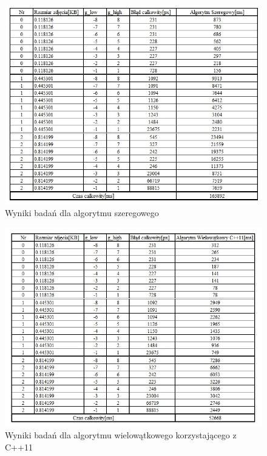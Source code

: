 \documentclass[document.tex]{subfiles}
\begin{document}
\begin{figure}[h]
\includegraphics[scale=0.75]{imgs/results_pc_serial}
\caption{Wyniki badań dla algorytmu szeregowego}
\label{fig:results_pc_serial}
\end{figure}

\begin{figure}[h]
\includegraphics[scale=0.75]{imgs/results_pc_cpp11_threads.jpg}
\caption{Wyniki badań dla algorytmu wielowątkowego korzystającego z C++11}
\label{fig:results_pc_cpp11_threads}
\end{figure}
\end{document}
